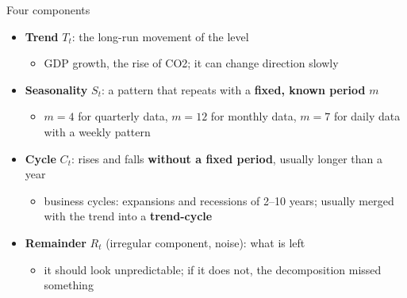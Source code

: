 \begin{frame}{Four components}
\itemsize{\small}
\begin{itemize}
    \item \textbf{Trend} $T_t$: the long-run movement of the level
    \begin{itemize}
        \item GDP growth, the rise of CO2; it can change direction slowly
    \end{itemize}
    \item \textbf{Seasonality} $S_t$: a pattern that repeats with a \textbf{fixed, known period} $m$
    \begin{itemize}
        \item $m = 4$ for quarterly data, $m = 12$ for monthly data, $m = 7$ for daily data with a weekly pattern
    \end{itemize}
    \item \textbf{Cycle} $C_t$: rises and falls \textbf{without a fixed period}, usually longer than a year
    \begin{itemize}
        \item business cycles: expansions and recessions of 2--10 years; usually merged with the trend into a \textbf{trend-cycle}
    \end{itemize}
    \item \textbf{Remainder} $R_t$ (irregular component, noise): what is left
    \begin{itemize}
        \item it should look unpredictable; if it does not, the decomposition missed something
    \end{itemize}
\end{itemize}
\end{frame}


